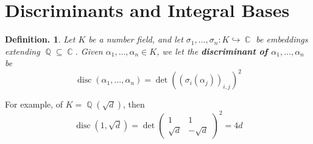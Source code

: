 \documentclass[11pt, a4paper]{memoir}
\DeclareMathOperator{\Q}{{\mathbb{Q}}}
\DeclareMathOperator{\C}{{\mathbb{C}}}
\theoremstyle{change}
\theoremstyle{plain}
\theoremstyle{nonumberplain}
\newtheorem{definition}{Definition.}
\DeclareMathOperator{\disc}{disc}
\begin{document}
\section{Discriminants and Integral Bases}
\begin{definition}
    Let $K$ be a number field, and let $\sigma_1,\ldots,\sigma_n:K\hookrightarrow\C$ be embeddings extending $\Q\subseteq\C$.
    Given $\alpha_1,\ldots,\alpha_n\in K$, we let the \textbf{discriminant of $\alpha_1,\ldots,\alpha_n$} be
    \begin{equation*}
        \disc(\alpha_1,\ldots,\alpha_n)=\det((\sigma_i(\alpha_j))_{i,j})^2
    \end{equation*}
\end{definition}
For example, of $K=\Q(\sqrt{d})$, then
\begin{equation*}\disc(1,\sqrt{d})=\det\begin{pmatrix}1&1\\\sqrt{d}&-\sqrt{d}\end{pmatrix}^2=4d\end{equation*}
\end{document}

